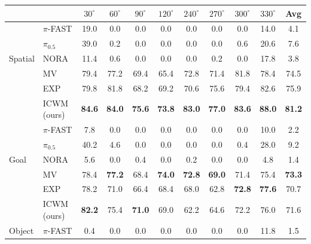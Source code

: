 \documentclass{llmxive}
\providecommand{\rowhighlight}{\rowcolor{deltaBg}}
\begin{document}
\begin{table}[t]\centering
\begin{tabular}{llccccccccc}\toprule
& &$30^\circ$ & $60^\circ$ &$90^\circ$ &$120^\circ$ &$240^\circ$ &$270^\circ$ &$300^\circ$ &$330^\circ$ &Avg \\
\midrule
\multirow{5}{*}{Spatial} &$\pi$-FAST &19.0 &0.0 &0.0 &0.0 &0.0 &0.0 &0.0 &14.0 &4.1 \\
&$\pi_{0.5}$ &39.0 &0.2 &0.0 &0.0 &0.0 &0.0 &0.6 &20.6 &7.6 \\
&NORA &11.4 &0.6 &0.0 &0.0 &0.0 &0.2 &0.0 &17.8 &3.8 \\
&MV &79.4 &77.2 &69.4 &65.4 &72.8 &71.4 &81.8 &78.4 &74.5 \\
&EXP &79.8 &81.8 &68.2 &69.2 &70.6 &75.6 &79.4 &82.6 &75.9 \\
\rowhighlight
&ICWM (ours) &\textbf{84.6} &\textbf{84.0} &\textbf{75.6} &\textbf{73.8} &\textbf{83.0} &\textbf{77.0} &\textbf{83.6} &\textbf{88.0} &\textbf{81.2} \\
\midrule
\multirow{5}{*}{Goal} &$\pi$-FAST &7.8 &0.0 &0.0 &0.0 &0.0 &0.0 &0.0 &10.0 &2.2 \\
&$\pi_{0.5}$ &40.2 &4.6 &0.0 &0.0 &0.0 &0.0 &0.4 &28.0 &9.2 \\
&NORA &5.6 &0.0 &0.4 &0.0 &0.2 &0.0 &0.0 &4.8 &1.4 \\
&MV &78.4 &\textbf{77.2} &68.4 &\textbf{74.0} &\textbf{72.8} &\textbf{69.0} &71.4 &75.4 &\textbf{73.3} \\
&EXP &78.2 &71.0 &66.4 &68.4 &68.0 &62.8 &\textbf{72.8} &\textbf{77.6} &70.7 \\
\rowhighlight
&ICWM (ours) &\textbf{82.2} &75.4 &\textbf{71.0} &69.0 &62.2 &64.6 &72.2 &76.0 &71.6 \\
\midrule
\multirow{5}{*}{Object} &$\pi$-FAST &0.4 &0.0 &0.0 &0.0 &0.0 &0.0 &0.0 &11.8 &1.5 \\

\end{tabular}
\end{table}
\end{document}
